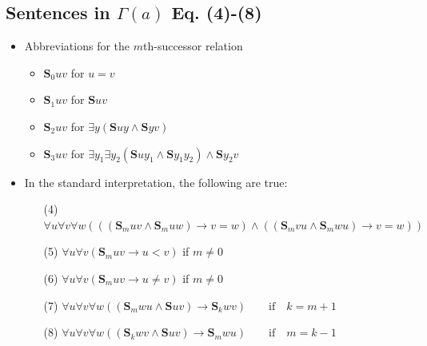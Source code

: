 \documentclass[
11pt,notheorems,hyperref={pdfauthor=whatever}
]{beamer}
\begin{document}
\subsection{Sentences in $\Gamma(a)$ Eq. (4)-(8)}
\begin{frame}
\begin{itemize}
    \setlength\itemsep{2em}
    \item Abbreviations for the $m$th-successor relation
    \vspace{0.5em}
    \begin{itemize}
        \setlength\itemsep{0.8em}
        \item $\pmb{S}_0 uv$ for $u=v$
        \item $\pmb{S}_1 uv$ for $\pmb{S} uv$
        \item $\pmb{S}_2 uv$ for $\exists y(\pmb{S}uy \wedge \pmb{S}yv)$
        \item $\pmb{S}_3 uv$ for $\exists y_1\exists y_2(\pmb{S}uy_1 \wedge \pmb{S}y_1 y_2) \wedge \pmb{S}y_2 v$
    \end{itemize}
    \item In the standard interpretation, the following are true:
    \vspace{0.5em}
    \begin{enumerate}
        \setlength\itemsep{0.8em}
        \item[(4)] $\forall u\forall v\forall w(((\pmb{S}_m uv \wedge \pmb{S}_m uw) \to v = w) \wedge ((\pmb{S}_m vu \wedge \pmb{S}_m wu) \to v = w))$
        \item[(5)] $\forall u\forall v(\pmb{S}_m uv \to u \pmb{<} v)$ if $m\neq 0$
        \item[(6)] $\forall u\forall v(\pmb{S}_m uv \to u \pmb{\neq} v)$ if $m\neq 0$
        \item[(7)] $\forall u\forall v\forall w((\pmb{S}_m wu \wedge \pmb{S} uv) \to \pmb{S}_k wv) \qquad \text{if} \quad k=m+1$
        \item[(8)] $\forall u\forall v\forall w((\pmb{S}_k wv \wedge \pmb{S} uv) \to \pmb{S}_m wu) \qquad \text{if} \quad m=k-1$
    \end{enumerate}
\end{itemize}
\end{frame}
\end{document}
